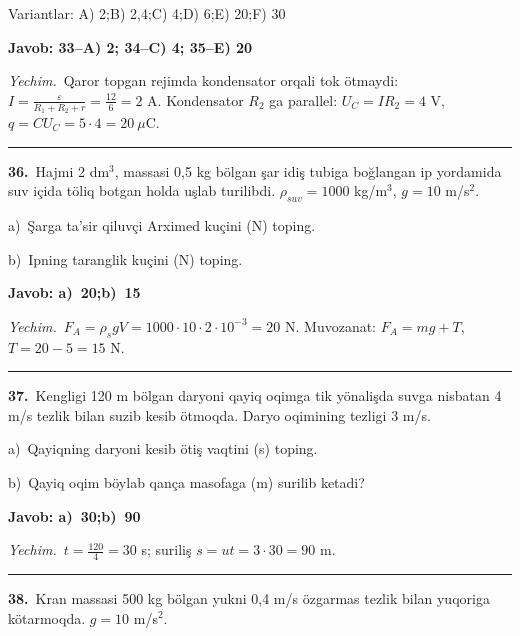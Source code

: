 \documentclass[11pt,a4paper]{article}
\begin{document}
\noindent Variantlar: A) 2;\quad B) 2,4;\quad C) 4;\quad D) 6;\quad E) 20;\quad F) 30\par\smallskip
\noindent\colorbox{gray!12}{\parbox{\dimexpr\linewidth-2\fboxsep}{\textbf{Javob: 33--A) 2; 34--C) 4; 35--E) 20}}}\par\smallskip
\noindent\textit{Yechim.}\ Qaror topgan rejimda kondensator orqali tok ötmaydi: $I=\frac{\varepsilon}{R_1+R_2+r}=\frac{12}{6}=2$ A. Kondensator $R_2$ ga parallel: $U_C=IR_2=4$ V, $q=CU_C=5\cdot4=20\ \mu$C.\par\par\medskip\hrule\medskip
{}\noindent\textbf{36.}\ Hajmi 2 dm$^3$, massasi 0,5 kg bölgan şar idiş tubiga boğlangan ip yordamida suv içida töliq botgan holda uşlab turilibdi. $\rho_{suv}=1000$ kg/m$^3$, $g=10$ m/s$^2$.\par
\noindent\hspace*{4mm}a)\ Şarga ta’sir qiluvçi Arximed kuçini (N) toping.\par
\noindent\hspace*{4mm}b)\ Ipning taranglik kuçini (N) toping.\par
\noindent\colorbox{gray!12}{\parbox{\dimexpr\linewidth-2\fboxsep}{\textbf{Javob: a)\ 20;\quad b)\ 15}}}\par\smallskip
\noindent\textit{Yechim.}\ $F_A=\rho_s gV=1000\cdot10\cdot2\cdot10^{-3}=20$ N. Muvozanat: $F_A=mg+T$, $T=20-5=15$ N.\par\par\medskip\hrule\medskip
{}\noindent\textbf{37.}\ Kengligi 120 m bölgan daryoni qayiq oqimga tik yönalişda suvga nisbatan 4 m/s tezlik bilan suzib kesib ötmoqda. Daryo oqimining tezligi 3 m/s.\par
\noindent\hspace*{4mm}a)\ Qayiqning daryoni kesib ötiş vaqtini (s) toping.\par
\noindent\hspace*{4mm}b)\ Qayiq oqim böylab qança masofaga (m) surilib ketadi?\par
\noindent\colorbox{gray!12}{\parbox{\dimexpr\linewidth-2\fboxsep}{\textbf{Javob: a)\ 30;\quad b)\ 90}}}\par\smallskip
\noindent\textit{Yechim.}\ $t=\frac{120}{4}=30$ s; suriliş $s=ut=3\cdot30=90$ m.\par\par\medskip\hrule\medskip
{}\noindent\textbf{38.}\ Kran massasi 500 kg bölgan yukni 0,4 m/s özgarmas tezlik bilan yuqoriga kötarmoqda. $g=10$ m/s$^2$.\par
\end{document}
